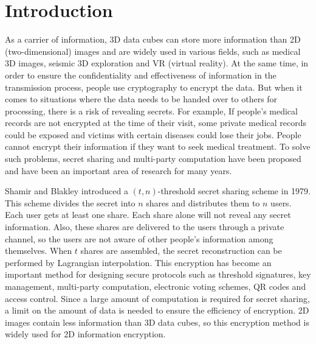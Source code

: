 \section{Introduction}\label{Sec_intro}

As a carrier of information, 3D data cubes can store more information than 2D (two-dimensional) images and are widely used in various fields, such as medical 3D images, seismic 3D exploration and VR (virtual reality). At the same time, in order to ensure the confidentiality and effectiveness of information in the transmission process, people use cryptography to encrypt the data\cite{2011Contemporary}. But when it comes to situations where the data needs to be handed over to others for processing, there is a risk of revealing secrets. For example, If people's medical records are not encrypted at the time of their visit, some private medical records could be exposed and victims with certain diseases could lose their jobs. People cannot encrypt their information if they want to seek medical treatment. To solve such problems, secret sharing and multi-party computation have been proposed and have been an important area of research for many years\cite{chanu2019survey}.

Shamir and Blakley introduced a $(t, n)$-threshold secret sharing scheme in 1979\cite{shamir1979share,mceliece1981sharing,blakley1979safeguarding}. This scheme divides the secret into $n$ shares and distributes them to $n$ users. Each user gets at least one share. Each share alone will not reveal any secret information. Also, these shares are delivered to the users through a private channel, so the users are not aware of other people's information among themselves. When $t$ shares are assembled, the secret reconstruction can be performed by Lagrangian interpolation. This encryption has become an important method for designing secure protocols such as threshold signatures\cite{wang2014simulatable}, key management\cite{hanaoka2002hierarchical,liu2017security}, multi-party computation\cite{halpern2004rational,pilaram2021efficient,blanton2020improved}, electronic voting schemes\cite{iftene2007general}, QR codes\cite{PAN2022103405,PAN2021104049,article} and access control\cite{han2012attribute}. Since a large amount of computation is required for secret sharing, a limit on the amount of data is needed to ensure the efficiency of encryption. 2D images contain less information than 3D data cubes, so this encryption method is widely used for 2D information encryption.

